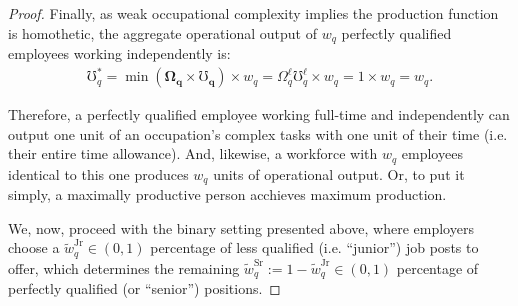 \documentclass[hidelinks, nonatbib]{elsarticle}
\begin{document}
\begin{lemma}
\begin{proof}
        Finally, as weak occupational complexity implies the production function is homothetic, the aggregate operational output of $w_q$ perfectly qualified employees working independently is:
        \begin{gather}
            \mho_{q}^{*}
            =
            \min(
                \boldsymbol{\Omega_q}
                \times
                \boldsymbol{\mho_q}
            )
            \times
            w_q
            =
            \Omega_{q}^{\ell}
            \mho_{q}^{\ell}
            \times
            w_q
            =
            1
            \times
            w_q
            =
            w_q
            .
        \end{gather}
        
        Therefore, a perfectly qualified employee working full-time and independently can output one unit of an occupation's complex tasks with one unit of their time (i.e. their entire time allowance). And, likewise, a workforce with $w_q$ employees identical to this one produces $w_q$ units of operational output. Or, to put it simply, a maximally productive person acchieves maximum production.
        
        We, now, proceed with the binary setting presented above, where employers choose a $\tilde{w}_{q}^{\text{Jr}} \in (0,1)$ percentage of less qualified (i.e. ``junior'') job posts to offer, which determines the remaining $\tilde{w}_{q}^{\text{Sr}} := 1 - \tilde{w}_{q}^{\text{Jr}} \in (0,1)$ percentage of perfectly qualified (or ``senior'') positions.
        

\end{proof}
\end{lemma}
\end{document}
